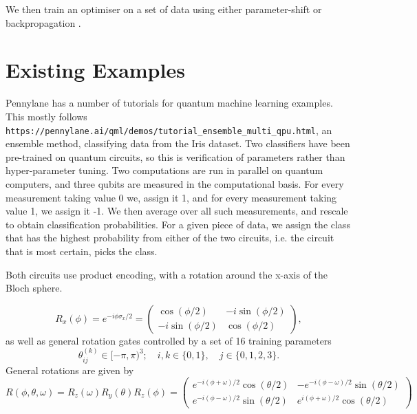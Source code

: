 \documentclass{article}
\theoremstyle{definition}
\begin{document}
We then train an optimiser on a set of data using either parameter-shift \cite{crooks2019gradients} or backpropagation \cite{watabe2019quantum}.



\section{Existing Examples}
Pennylane has a number of tutorials for quantum machine learning examples. This mostly follows \\ \verb|https://pennylane.ai/qml/demos/tutorial_ensemble_multi_qpu.html|, an ensemble method, classifying data from the Iris dataset. Two classifiers have been pre-trained on quantum circuits, so this is verification of parameters rather than hyper-parameter tuning. Two computations are run in parallel on quantum computers, and three qubits are measured in the computational basis. For every measurement taking value 0 we, assign it 1, and for every measurement taking value 1, we assign it -1. We then average over all such measurements,  and rescale to obtain classification probabilities. For a given piece of data, we assign the class that has the highest probability from either of the two circuits, i.e. the circuit that is most certain, picks the class. 

Both circuits use product encoding, with a rotation around the x-axis of the Bloch sphere.

\[
R_x(\phi) = e^{ - i \phi \sigma_x / 2} = \begin{pmatrix} \cos ( \phi / 2) & - i \sin (\phi / 2) \\ - i \sin( \phi / 2) & \cos(\phi / 2)
\end{pmatrix},
\]
as well as general rotation gates controlled by a set of 16 training parameters 
\[
\theta_{ij}^{(k)} \in [- \pi, \pi)^3 ; \quad  i,k \in \{0,1\}, \quad j \in \{0,1,2,3\}.
\]
General rotations are given by
\[
R(\phi, \theta, \omega) = R_z(\omega)R_y(\theta)R_z(\phi) = \begin{pmatrix} e^{-i ( \phi + \omega) /2}\cos ( \theta / 2) & - e^{-i ( \phi - \omega) /2} \sin (\theta / 2) \\ e^{-i ( \phi - \omega) /2} \sin( \theta / 2) &  e^{i ( \phi + \omega) /2}\cos(\theta / 2)
\end{pmatrix}
\]
\end{document}
